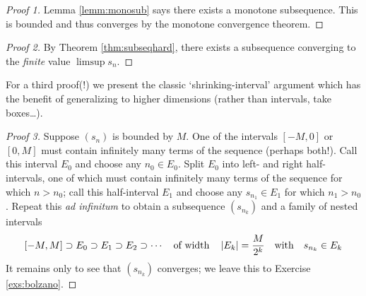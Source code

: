 

\begin{proof}[Proof 1]
	Lemma \ref{lemm:monosub} says there exists a monotone subsequence. This is bounded and thus converges by the monotone convergence theorem.
\end{proof}

\begin{proof}[Proof 2]
	By Theorem \ref{thm:subseqhard}, there exists a subsequence converging to the \emph{finite} value $\limsup s_n$.
\end{proof}

For a third proof(!) we present the classic `shrinking-interval' argument which has the benefit of generalizing to higher dimensions (rather than intervals, take boxes\ldots).

\begin{proof}[Proof 3]
	Suppose $(s_n)$ is bounded by $M$. One of the intervals $[-M,0]$ or $[0,M]$ must contain infinitely many terms of the sequence (perhaps both!). Call this interval $E_0$ and choose any $n_0\in E_0$.\smallbreak
	Split $E_0$ into left- and right half-intervals, one of which must contain infinitely many terms of the sequence for which $n>n_0$;\footnotemark{} call this half-interval $E_1$ and choose any $s_{n_1}\in E_1$ for which $n_1>n_0$.\smallbreak
	Repeat this \emph{ad infinitum} to obtain a subsequence $(s_{n_k})$ and a family of nested intervals
	\[[-M,M]\supset E_0\supset E_1\supset E_2\supset\cdots\quad\text{of width}\quad\left| E_k\right|=\frac{M}{2^k}\quad\text{with}\quad s_{n_k}\in E_k\]
	It remains only to see that $(s_{n_k})$ converges; we leave this to Exercise \ref{exs:bolzano}.%
\end{proof}



